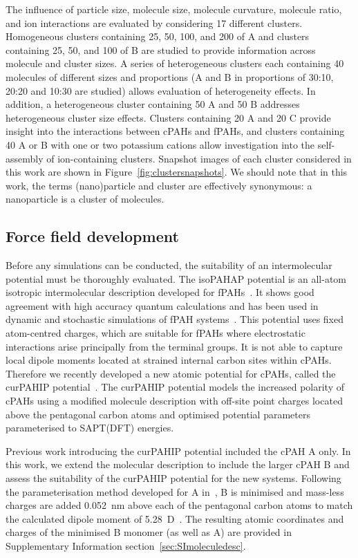The influence of particle size, molecule size, molecule curvature, molecule ratio, and ion interactions are evaluated by considering 17 different clusters. Homogeneous clusters containing 25, 50, 100, and 200 of A and clusters containing 25, 50, and 100 of B are studied to provide information across molecule and cluster sizes. A series of heterogeneous clusters each containing 40 molecules of different sizes and proportions (A and B in proportions of 30:10, 20:20 and 10:30 are studied) allows evaluation of heterogeneity effects. In addition, a heterogeneous cluster containing 50 A and 50 B addresses heterogeneous cluster size effects. Clusters containing 20 A and 20 C provide insight into the interactions between cPAHs and fPAHs, and clusters containing 40 A or B with one or two potassium cations allow investigation into the self-assembly of ion-containing clusters. Snapshot images of each cluster considered in this work are shown in Figure~\ref{fig:clustersnapshots}. We should note that in this work, the terms (nano)particle and cluster are effectively synonymous: a nanoparticle is a cluster of molecules.

\subsection{Force field development}
Before any simulations can be conducted, the suitability of an intermolecular potential must be thoroughly evaluated. The isoPAHAP potential is an all-atom isotropic intermolecular description developed for fPAHs~\cite{totton2010first}. It shows good agreement with high accuracy quantum calculations and has been used in dynamic and stochastic simulations of fPAH systems~\cite{Totton2012quantitative,bowal2019sphere,Grancic2016,Pascazio2017}. This potential uses fixed atom-centred charges, which are suitable for fPAHs where electrostatic interactions arise principally from the terminal groups. It is not able to capture local dipole moments located at strained internal carbon sites within cPAHs. Therefore we recently developed a new atomic potential for cPAHs, called the curPAHIP potential~\cite{bowal2019ion}. The curPAHIP potential models the increased polarity of cPAHs using a modified molecule description with off-site point charges located above the pentagonal carbon atoms and optimised potential parameters parameterised to SAPT(DFT) energies.

Previous work introducing the curPAHIP potential included the cPAH A only. In this work, we extend the molecular description to include the larger cPAH B and assess the suitability of the curPAHIP potential for the new systems. Following the parameterisation method developed for A in~\citet{bowal2019ion}, B is minimised and mass-less charges are added 0.052~nm above each of the pentagonal carbon atoms to match the calculated dipole moment of 5.28~D~\cite{Martin2018flexo}. The resulting atomic coordinates and charges of the minimised B monomer (as well as A) are provided in Supplementary Information section~\ref{sec:SImoleculedesc}.

